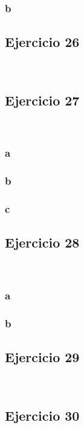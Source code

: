 \documentclass{article}
\begin{document}
\subsubsection*{b}

\subsection*{Ejercicio 26}

\

\subsection*{Ejercicio 27}

\

\subsubsection*{a}

\subsubsection*{b}

\subsubsection*{c}

\subsection*{Ejercicio 28}

\

\subsubsection*{a}

\subsubsection*{b}

\subsection*{Ejercicio 29}

\

\subsection*{Ejercicio 30}
\end{document}
